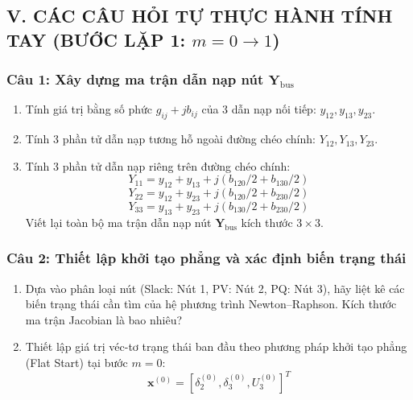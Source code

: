 \documentclass[10.5pt,a4paper]{article}
\begin{document}
\clearpage

\subsection*{V. CÁC CÂU HỎI TỰ THỰC HÀNH TÍNH TAY (BƯỚC LẶP 1: $m = 0 \to 1$)}
\vspace{-4pt}

\subsubsection*{Câu 1: Xây dựng ma trận dẫn nạp nút $\mathbf{Y}_{\text{bus}}$}
\begin{enumerate}\setlength{\itemsep}{2pt}\setlength{\parskip}{0pt}
    \item[1.1] Tính giá trị bằng số phức $g_{ij} + j b_{ij}$ của 3 dẫn nạp nối tiếp: $y_{12}, y_{13}, y_{23}$.
    \item[1.2] Tính 3 phần tử dẫn nạp tương hỗ ngoài đường chéo chính: $Y_{12}, Y_{13}, Y_{23}$.
    \item[1.3] Tính 3 phần tử dẫn nạp riêng trên đường chéo chính:
    $$Y_{11} = y_{12} + y_{13} + j(b_{120}/2 + b_{130}/2)$$
    $$Y_{22} = y_{12} + y_{23} + j(b_{120}/2 + b_{230}/2)$$
    $$Y_{33} = y_{13} + y_{23} + j(b_{130}/2 + b_{230}/2)$$
    Viết lại toàn bộ ma trận dẫn nạp nút $\mathbf{Y}_{\text{bus}}$ kích thước $3 \times 3$.
\end{enumerate}

\subsubsection*{Câu 2: Thiết lập khởi tạo phẳng và xác định biến trạng thái}
\begin{enumerate}\setlength{\itemsep}{2pt}\setlength{\parskip}{0pt}
    \item[2.1] Dựa vào phân loại nút (Slack: Nút 1, PV: Nút 2, PQ: Nút 3), hãy liệt kê các biến trạng thái cần tìm của hệ phương trình Newton--Raphson. Kích thước ma trận Jacobian là bao nhiêu?
    \item[2.2] Thiết lập giá trị véc-tơ trạng thái ban đầu theo phương pháp khởi tạo phẳng (Flat Start) tại bước $m = 0$:
    $$\mathbf{x}^{(0)} = [\delta_2^{(0)}, \delta_3^{(0)}, U_3^{(0)}]^T$$
\end{enumerate}
\end{document}

